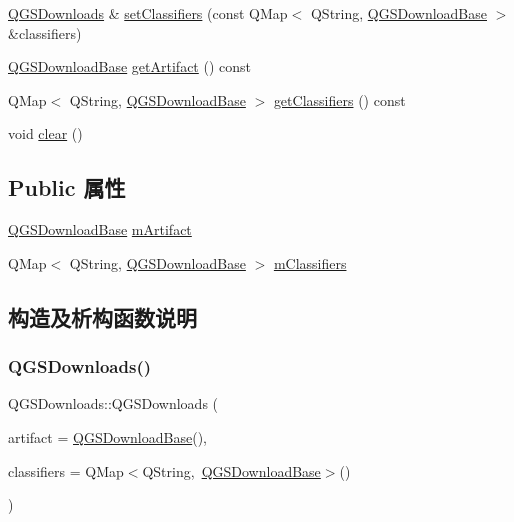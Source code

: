 \begin{DoxyCompactItemize}
\item 
\mbox{\hyperlink{class_q_g_s_downloads}{Q\+G\+S\+Downloads}} \& \mbox{\hyperlink{class_q_g_s_downloads_ac16230e102180498beac4e3cc57b68a9}{set\+Classifiers}} (const Q\+Map$<$ Q\+String, \mbox{\hyperlink{class_q_g_s_download_base}{Q\+G\+S\+Download\+Base}} $>$ \&classifiers)
\item 
\mbox{\hyperlink{class_q_g_s_download_base}{Q\+G\+S\+Download\+Base}} \mbox{\hyperlink{class_q_g_s_downloads_acdfd11b32b12c162be5900c5d6f9457a}{get\+Artifact}} () const
\item 
Q\+Map$<$ Q\+String, \mbox{\hyperlink{class_q_g_s_download_base}{Q\+G\+S\+Download\+Base}} $>$ \mbox{\hyperlink{class_q_g_s_downloads_a734a2d34db6c5522ad3b801daf04e271}{get\+Classifiers}} () const
\item 
void \mbox{\hyperlink{class_q_g_s_downloads_a0e297c3394413af1514020c24136d8fe}{clear}} ()
\end{DoxyCompactItemize}
\subsection*{Public 属性}
\begin{DoxyCompactItemize}
\item 
\mbox{\hyperlink{class_q_g_s_download_base}{Q\+G\+S\+Download\+Base}} \mbox{\hyperlink{class_q_g_s_downloads_acd8639e1d3070fdaf8d96480ab1b509f}{m\+Artifact}}
\item 
Q\+Map$<$ Q\+String, \mbox{\hyperlink{class_q_g_s_download_base}{Q\+G\+S\+Download\+Base}} $>$ \mbox{\hyperlink{class_q_g_s_downloads_a4af8707dddbc0d69c15c194d58741925}{m\+Classifiers}}
\end{DoxyCompactItemize}


\subsection{构造及析构函数说明}
\mbox{\label{class_q_g_s_downloads_aa04a77c3b2cd252b82f5741835355649}} 
\subsubsection{\texorpdfstring{Q\+G\+S\+Downloads()}{QGSDownloads()}\hspace{0.1cm}{\footnotesize\ttfamily [1/3]}}
{\footnotesize\ttfamily Q\+G\+S\+Downloads\+::\+Q\+G\+S\+Downloads (\begin{DoxyParamCaption}\item[{const \mbox{\hyperlink{class_q_g_s_download_base}{Q\+G\+S\+Download\+Base}} \&}]{artifact = {\ttfamily \mbox{\hyperlink{class_q_g_s_download_base}{Q\+G\+S\+Download\+Base}}()},  }\item[{const Q\+Map$<$ Q\+String, \mbox{\hyperlink{class_q_g_s_download_base}{Q\+G\+S\+Download\+Base}} $>$ \&}]{classifiers = {\ttfamily QMap$<$QString,~\mbox{\hyperlink{class_q_g_s_download_base}{Q\+G\+S\+Download\+Base}}$>$()} }\end{DoxyParamCaption})}

